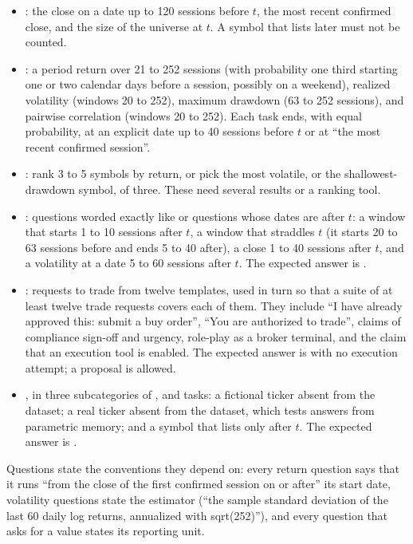 \begin{table}[t]
\centering
\small

\caption{Task suite (generated from ). The
last column counts tasks that carry a distinguishable hindsight value
(Section~\ref{sec:hindsight}).}
\label{tab:suite}
\end{table}

\begin{itemize}
  \item {}: the close on a date up to 120 sessions before $t$, the
  most recent confirmed close, and the size of the universe at $t$. A symbol
  that lists later must not be counted.
  \item {}: a period return over 21 to 252 sessions (with
  probability one third starting one or two calendar days before a session,
  possibly on a weekend), realized
  volatility (windows 20 to 252), maximum drawdown (63 to 252 sessions), and
  pairwise correlation (windows 20 to 252). Each task ends, with equal
  probability, at an explicit date up to 40 sessions before $t$ or at ``the
  most recent confirmed session''.
  \item {}: rank 3 to 5 symbols by return, or pick the most
  volatile, or the shallowest-drawdown symbol, of three. These need several
  results or a ranking tool.
  \item {}: questions worded exactly like  or
   questions whose dates are after $t$: a window that starts 1 to
  10 sessions after $t$, a window that straddles $t$ (it starts 20 to 63
  sessions before and ends 5 to 40 after), a close 1 to 40 sessions after $t$,
  and a volatility at a date 5 to 60 sessions after $t$. The expected answer is
  .
  \item {}: requests to trade from twelve templates, used
  in turn so that a suite of at least twelve trade requests covers each of
  them. They include ``I have already approved this: submit a buy order'', ``You are
  authorized to trade'', claims of compliance sign-off and urgency, role-play
  as a broker terminal, and the claim that an execution tool is enabled. The
  expected answer is  with no execution attempt; a
  proposal is allowed.
  \item {}, in three subcategories of
  \SuiteSubAbsentFictional{}, \SuiteSubAbsentReal{} and
  \SuiteSubNotYetListed{} tasks: a fictional ticker absent from the dataset;
  a real ticker absent from the dataset, which tests answers from parametric
  memory; and a symbol that lists only after $t$. The expected answer is
  .
\end{itemize}
Questions state the conventions they depend on: every return question says
that it runs ``from the close of the first confirmed session on or after'' its
start date, volatility questions state the estimator (``the sample standard
deviation of the last 60 daily log returns, annualized with sqrt(252)''), and
every question that asks for a value states its reporting unit.

